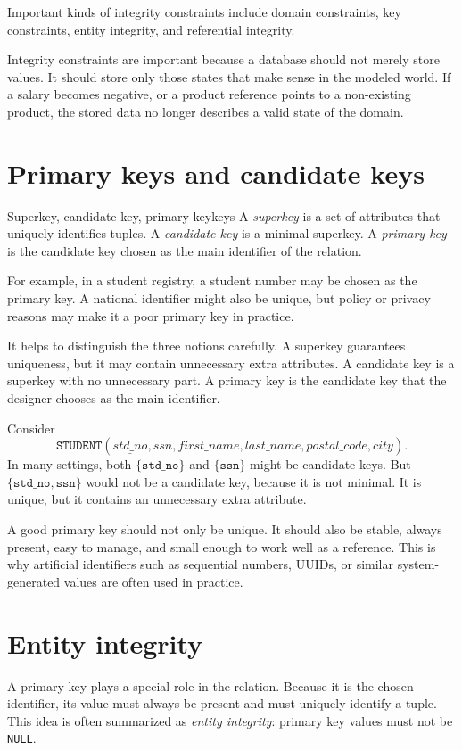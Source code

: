 \documentclass[11pt,a4paper,openany]{book}
\newcommand{\keyattr}[1]{\underline{#1}}
\begin{document}
Important kinds of integrity constraints include domain constraints, key constraints, entity integrity, and referential integrity.

Integrity constraints are important because a database should not merely store values. It should store only those states that make sense in the modeled world. If a salary becomes negative, or a product reference points to a non-existing product, the stored data no longer describes a valid state of the domain.

\section{Primary keys and candidate keys}
\begin{definition}{Superkey, candidate key, primary key}{keys}
A \emph{superkey} is a set of attributes that uniquely identifies tuples. A \emph{candidate key} is a minimal superkey. A \emph{primary key} is the candidate key chosen as the main identifier of the relation.
\end{definition}

For example, in a student registry, a student number may be chosen as the primary key. A national identifier might also be unique, but policy or privacy reasons may make it a poor primary key in practice.

It helps to distinguish the three notions carefully. A superkey guarantees uniqueness, but it may contain unnecessary extra attributes. A candidate key is a superkey with no unnecessary part. A primary key is the candidate key that the designer chooses as the main identifier.

Consider
\[
\texttt{STUDENT}(\keyattr{std\_no}, ssn, first\_name, last\_name, postal\_code, city).
\]
In many settings, both \(\{\texttt{std\_no}\}\) and \(\{\texttt{ssn}\}\) might be candidate keys. But \(\{\texttt{std\_no},\texttt{ssn}\}\) would not be a candidate key, because it is not minimal. It is unique, but it contains an unnecessary extra attribute.

A good primary key should not only be unique. It should also be stable, always present, easy to manage, and small enough to work well as a reference. This is why artificial identifiers such as sequential numbers, UUIDs, or similar system-generated values are often used in practice.

\section{Entity integrity}
A primary key plays a special role in the relation. Because it is the chosen identifier, its value must always be present and must uniquely identify a tuple. This idea is often summarized as \emph{entity integrity}: primary key values must not be \texttt{NULL}.
\end{document}
